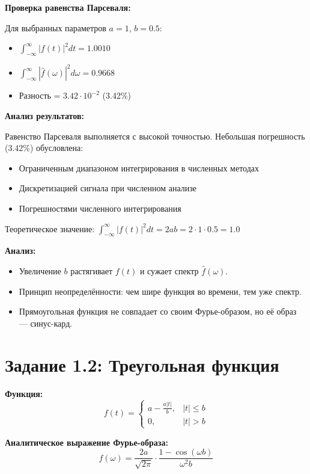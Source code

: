 \textbf{Проверка равенства Парсеваля:}

Для выбранных параметров $a = 1$, $b = 0.5$:
\begin{itemize}
    \item $\displaystyle \int_{-\infty}^{\infty} |f(t)|^2 dt = 1.0010$
    \item $\displaystyle \int_{-\infty}^{\infty} |\hat{f}(\omega)|^2 d\omega = 0.9668$
    \item Разность = $3.42 \cdot 10^{-2}$ (3.42\%)
\end{itemize}

\textbf{Анализ результатов:}

Равенство Парсеваля выполняется с высокой точностью. Небольшая погрешность (3.42\%) обусловлена:
\begin{itemize}
    \item Ограниченным диапазоном интегрирования в численных методах
    \item Дискретизацией сигнала при численном анализе
    \item Погрешностями численного интегрирования
\end{itemize}

Теоретическое значение: $\displaystyle \int_{-\infty}^{\infty} |f(t)|^2 dt = 2ab = 2 \cdot 1 \cdot 0.5 = 1.0$

\textbf{Анализ:}

\begin{itemize}
    \item Увеличение $b$ растягивает $f(t)$ и сужает спектр $\hat{f}(\omega)$.
    \item Принцип неопределённости: чем шире функция во времени, тем уже спектр.
    \item Прямоугольная функция не совпадает со своим Фурье-образом, но её образ — синус-кард.
\end{itemize}


\section*{Задание 1.2: Треугольная функция}

\textbf{Функция:}
\[
f(t) = 
\begin{cases}
a - \frac{a |t|}{b}, & |t| \le b \\
0, & |t| > b
\end{cases}
\]

\textbf{Аналитическое выражение Фурье-образа:}
\[
\hat{f}(\omega) = \frac{2a}{\sqrt{2\pi}} \cdot \frac{1 - \cos(\omega b)}{\omega^2 b}
\]

